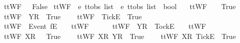 \begin{isabellebody}
{\ \ {\isachardoublequoteopen}ttWF\ {\isasymsigma}\ {\isacharequal}\ False{\isachardoublequoteclose}%
}
\isamarkupfalse%
\ ttWF{}\ {\isacharcolon}{\isacharcolon}\ {\isachardoublequoteopen}{\isacharprime}e\ ttobs\ list\ {\isasymRightarrow}\ {\isacharprime}e\ ttobs\ list\ {\isasymRightarrow}\ bool{\isachardoublequoteclose}\ \isanewline
\ \ {\isachardoublequoteopen}ttWF{}\ {\isacharbrackleft}{\isacharbrackright}\ {\isacharbrackleft}{\isacharbrackright}\ {\isacharequal}\ True{\isachardoublequoteclose}\ {\isacharbar}\ \isanewline
\ \ {\isachardoublequoteopen}ttWF{}\ {\isacharbrackleft}{\isacharbrackright}\ {\isacharbrackleft}{\isacharbrackleft}Y{\isacharbrackright}\isactrlsub R{\isacharbrackright}\ {\isacharequal}\ True{\isachardoublequoteclose}\ {\isacharbar}\ \isanewline
\ \ {\isachardoublequoteopen}ttWF{}\ {\isacharbrackleft}{\isacharbrackright}\ {\isacharbrackleft}{\isacharbrackleft}Tick{\isacharbrackright}\isactrlsub E{\isacharbrackright}\ {\isacharequal}\ True{\isachardoublequoteclose}\ {\isacharbar}\ \isanewline
\ \ {\isachardoublequoteopen}ttWF{}\ {\isacharbrackleft}{\isacharbrackright}\ {\isacharparenleft}{\isacharbrackleft}Event\ f{\isacharbrackright}\isactrlsub E\ {\isacharhash}\ {\isasymsigma}{\isacharparenright}\ {\isacharequal}\ ttWF{}\ {\isacharbrackleft}{\isacharbrackright}\ {\isasymsigma}{\isachardoublequoteclose}\ {\isacharbar}\ \isanewline
\ \ {\isachardoublequoteopen}ttWF{}\ {\isacharbrackleft}{\isacharbrackright}\ {\isacharparenleft}{\isacharbrackleft}Y{\isacharbrackright}\isactrlsub R\ {\isacharhash}\ {\isacharbrackleft}Tock{\isacharbrackright}\isactrlsub E\ {\isacharhash}\ {\isasymsigma}{\isacharparenright}\ {\isacharequal}\ ttWF{}\ {\isacharbrackleft}{\isacharbrackright}\ {\isasymsigma}{\isachardoublequoteclose}\ {\isacharbar}\ \isanewline
\ \ {\isachardoublequoteopen}ttWF{}\ {\isacharbrackleft}{\isacharbrackleft}X{\isacharbrackright}\isactrlsub R{\isacharbrackright}\ {\isacharbrackleft}{\isacharbrackright}\ {\isacharequal}\ True{\isachardoublequoteclose}\ {\isacharbar}\ \isanewline
\ \ {\isachardoublequoteopen}ttWF{}\ {\isacharbrackleft}{\isacharbrackleft}X{\isacharbrackright}\isactrlsub R{\isacharbrackright}\ {\isacharbrackleft}{\isacharbrackleft}Y{\isacharbrackright}\isactrlsub R{\isacharbrackright}\ {\isacharequal}\ True{\isachardoublequoteclose}\ {\isacharbar}\ \isanewline
\ \ {\isachardoublequoteopen}ttWF{}\ {\isacharbrackleft}{\isacharbrackleft}X{\isacharbrackright}\isactrlsub R{\isacharbrackright}\ {\isacharbrackleft}{\isacharbrackleft}Tick{\isacharbrackright}\isactrlsub E{\isacharbrackright}\ {\isacharequal}\ True{\isachardoublequoteclose}\ {\isacharbar}\ \isanewline

\end{isabellebody}
